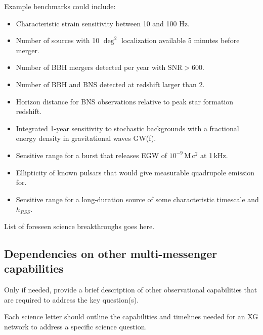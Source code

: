 \documentclass[11pt, singlecolumn, citestyle=authoryear]{elegantbook}
\begin{document}
Example benchmarks could include:
\begin{itemize}
\item Characteristic strain sensitivity between 10 and 100 Hz.
\item Number of sources with 10 $\deg^2$ localization available 5 minutes before merger.
\item Number of BBH mergers detected per year with SNR$>600$. 
\item Number of BBH and BNS detected at redshift larger than 2.
\item Horizon distance for BNS observations relative to peak star formation redshift.
\item Integrated 1-year sensitivity to stochastic backgrounds with a fractional energy density in gravitational waves GW(f).
\item Sensitive range for a burst that releases EGW of  $10^{-9}$\,M\,c$^2$ at 1\,kHz.
\item Ellipticity of known pulsars that would give measurable quadrupole emission for.
\item Sensitive range for a long-duration source of some characteristic timescale and $h_{RSS}$.
\end{itemize}

\begin{tcolorbox}[enhanced,attach boxed title to top center={yshift=-3mm,yshifttext=-1mm},colback=cyan!5!white,colframe=cyan!75!black,colbacktitle=cyan!80!black,title=SCIENTIFIC IMPACT OF XG DETECTORS,fonttitle=\bfseries, boxed title style={size=small,colframe=cyan!75!black} ]
  List of foreseen science breakthroughs goes here.
\end{tcolorbox}

\subsection*{Dependencies on other multi-messenger capabilities}
Only if needed, provide a brief description of other observational capabilities that are required to address the key question(s).

\begin{tcolorbox}[enhanced,frame style image=blueshade.png,
  opacityback=0.75,opacitybacktitle=0.25,
  colback=blue!5!white,colframe=blue!75!black,
  title={\bf \centering XG DETECTOR AND NETWORK REQUIREMENTS}]
  Each science letter should outline the capabilities and timelines needed for an XG network to address a specific science question. 
\end{tcolorbox}
\end{document}
